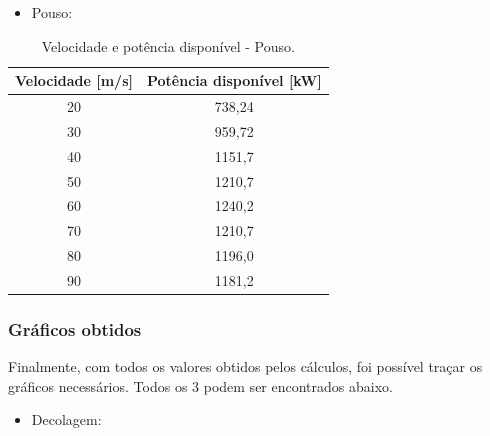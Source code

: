 \begin{itemize}
    \item{Pouso:}
\end{itemize}

\begin{table}[H]
\centering
\caption{Velocidade e potência disponível - Pouso.}
\begin{tabular}{cc}
\hline
Velocidade [m/s] & Potência disponível [kW] \\
\hline
20 & 738{,}24 \\
30 & 959{,}72 \\
40 & 1151{,}7 \\
50 & 1210{,}7 \\
60 & 1240{,}2 \\
70 & 1210{,}7 \\
80 & 1196{,}0 \\
90 & 1181{,}2 \\
\hline
\end{tabular}
\end{table}

\subsubsection{Gráficos obtidos}

Finalmente, com todos os valores obtidos pelos cálculos, foi possível traçar os gráficos necessários. Todos os 3 podem ser encontrados abaixo.

\clearpage

\begin{itemize}
    \item{Decolagem:}
\end{itemize}

